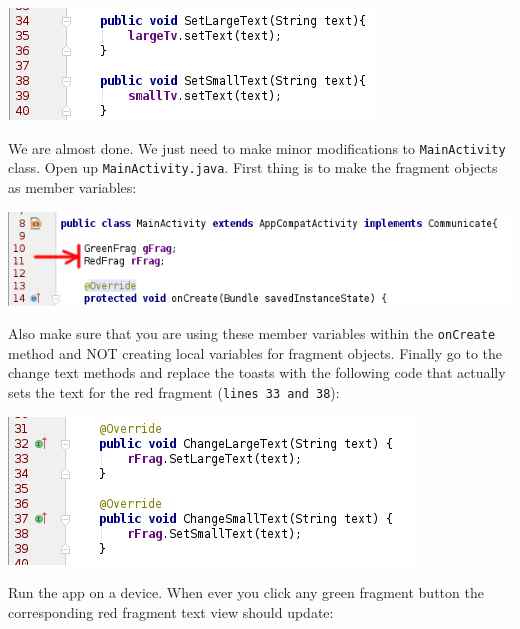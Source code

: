 \begin{center}
	\includegraphics[scale=\SourceCodeScale]{chapters/ch11/images/33}
\end{center}

We are almost done. We just need to make minor modifications to \texttt{MainActivity} class. Open up \texttt{MainActivity.java}. First thing is to make the fragment objects as member variables:

\begin{center}
	\includegraphics[scale=\SourceCodeScale]{chapters/ch11/images/34}
\end{center}

Also make sure that you are using these member variables within the \texttt{onCreate} method and NOT creating local variables for fragment objects. Finally go to the change text methods and replace the toasts with the following code that actually sets the text for the red fragment (\texttt{lines 33 and 38}):

\begin{center}
	\includegraphics[scale=\SourceCodeScale]{chapters/ch11/images/35}
\end{center}

Run the app on a device. When ever you click any green fragment button the corresponding red fragment text view should update:

